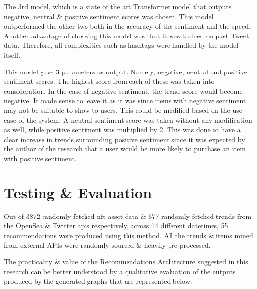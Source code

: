 \documentclass[manuscript,natbib=false]{acmart}
\begin{document}
The 3rd model, which is a state of the art Transformer model \cite{CardiffnlpTwitterrobertabasesentimentHugging, wolfTransformersStateoftheArtNatural2020} that outputs negative, neutral \& positive sentiment scores was chosen. This model outperformed the other two both in the accuracy of the sentiment and the speed. Another advantage of choosing this model was that it was trained on past Tweet data. Therefore, all complexities such as hashtags were handled by the model itself.

This model gave 3 parameters as output. Namely, negative, neutral and positive sentiment scores. The highest score from each of these was taken into consideration.
In the case of negative sentiment, the trend score would become negative. It made sense to leave it as it was since items with negative sentiment may not be suitable to show to users. This could be modified based on the use case of the system.
A neutral sentiment score was taken without any modification as well, while positive sentiment was multiplied by 2. This was done to have a clear increase in trends surrounding positive sentiment since it was expected by the author of the research that a user would be more likely to purchase an item with positive sentiment.

\section{Testing \& Evaluation}

Out of 3872 randomly fetched \gls{nft} asset data \& 677 randomly fetched trends from the OpenSea \& Twitter \gls{api}s respectively, across 14 different datetimes, 55 recommendations were produced using this method. All the trends \& items mined from external APIs were randomly sourced \& heavily pre-processed.

The practicality \& value of the Recommendations Architecture suggested in this research can be better understood by a qualitative evaluation of the outputs produced by the generated graphs that are represented below.
\end{document}

